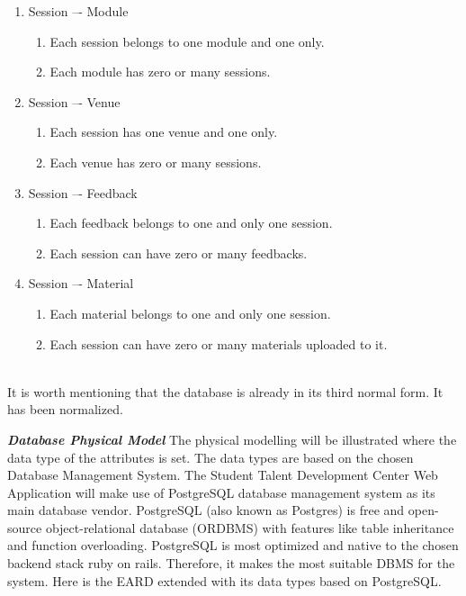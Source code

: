 \begin{justify}
\begin{enumerate}
    \item Session –- Module
        \begin{enumerate}
            \item Each session belongs to one module and one only.
            \item Each module has zero or many sessions.
        \end{enumerate}

    \item Session –- Venue
        \begin{enumerate}
            \item Each session has one venue and one only.
            \item Each venue has zero or many sessions.
        \end{enumerate}

    \item Session –- Feedback
        \begin{enumerate}
            \item Each feedback belongs to one and only one session.
            \item Each session can have zero or many feedbacks.
        \end{enumerate}

    \item Session –- Material
        \begin{enumerate}
            \item Each material belongs to one and only one session.
            \item Each session can have zero or many materials uploaded to it.
        \end{enumerate}
\end{enumerate}

\vspace{0.25cm}
\\
It is worth mentioning that the database is already in its third normal form. It has been normalized.

\vspace{0.25cm}
\newendline \textbf{\textit{Database Physical Model}}\newendline
The physical modelling will be illustrated where the data type of the attributes is set. The data types are based on the chosen Database Management System.  The Student Talent Development Center Web Application will make use of PostgreSQL database management system as its main database vendor. PostgreSQL (also known as Postgres) is free and open-source object-relational database (ORDBMS) with features like table inheritance and function overloading. PostgreSQL is most optimized and native to the chosen backend stack ruby on rails. Therefore, it makes the most suitable DBMS for the system. Here is the EARD extended with its data types based on PostgreSQL.


\end{justify}
